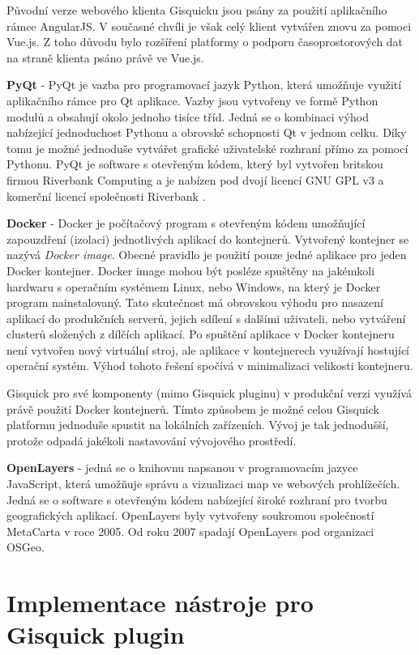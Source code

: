 Původní verze webového klienta Gisquicku jsou psány za použití
aplikačního rámce AngularJS. V současné chvíli je však celý klient
vytvářen znovu za pomoci Vue.js. Z toho důvodu bylo rozšíření platformy
o podporu časoprostorových dat na straně klienta psáno právě ve Vue.js.

\newpage
\bigskip
\noindent
\textbf{PyQt} - PyQt je vazba pro programovací jazyk Python, která umožňuje
využití aplikačního rámce pro Qt aplikace. Vazby jsou vytvořeny ve formě
Python modulů a obsahují okolo jednoho tisíce tříd. Jedná se o kombinaci
výhod nabízející jednoduchost Pythonu a obrovské schopnosti Qt v jednom
celku. Díky tomu je možné jednoduše vytvářet grafické uživatelské
rozhraní přímo za pomocí Pythonu. PyQt je software s otevřeným kódem,
který byl vytvořen britskou firmou Riverbank Computing a je nabízen pod
dvojí licencí GNU GPL v3 a komerční licencí společnosti Riverbank
\cite{pyqt}.

\bigskip
\noindent
\textbf{Docker} - Docker je počítačový program s otevřeným
kódem umožňující zapouzdření (izolaci) jednotlivých aplikací do
kontejnerů. Vytvořený kontejner se nazývá \textit{Docker image}. Obecné
pravidlo je použití pouze jedné aplikace pro jeden Docker kontejner. Docker
image mohou být posléze spuštěny na jakémkoli hardwaru s operačním
systémem Linux, nebo Windows, na který je Docker program nainstalovaný. Tato
skutečnost má obrovskou výhodu pro nasazení aplikací do produkčních
serverů, jejich sdílení s dalšími uživateli, nebo vytváření
clusterů složených z dílčích aplikací. Po spuštění aplikace v
Docker kontejneru není vytvořen nový virtuální stroj, ale aplikace
v kontejnerech využívají hostující operační systém. Výhod tohoto
řešení spočívá v minimalizaci velikosti kontejneru.

Gisquick pro své komponenty (mimo Gisquick pluginu) v produkční
verzi využívá právě použití Docker kontejnerů. Tímto způsobem
je možné celou Gisquick platformu jednoduše spustit na lokálních
zařízeních. Vývoj je tak jednodušší, protože odpadá jakékoli
nastavování vývojového prostředí.

\bigskip
\noindent
\textbf{OpenLayers} - jedná se o knihovnu napsanou v programovacím
jazyce JavaScript, která umožňuje správu a vizualizaci map ve webových
prohlížečích. Jedná se o software s otevřeným kódem nabízející
široké rozhraní pro tvorbu geografických aplikací. OpenLayers byly
vytvořeny soukromou společností MetaCarta v roce 2005. Od roku 2007
spadají OpenLayers pod organizaci OSGeo.

\newpage
\section{Implementace nástroje pro Gisquick plugin}


